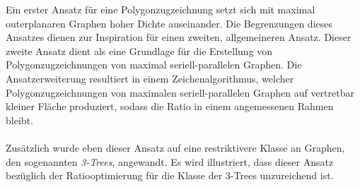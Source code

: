 Ein erster Ansatz für eine Polygonzugzeichnung setzt sich mit maximal outerplanaren Graphen hoher Dichte auseinander. Die Begrenzungen dieses Ansatzes dienen zur Inspiration für einen zweiten, allgemeineren Ansatz. Dieser zweite Ansatz dient als eine Grundlage für die Erstellung von Polygonzugzeichnungen von maximal seriell-parallelen Graphen. Die Ansatzerweiterung resultiert in einem Zeichenalgorithmus, welcher Polygonzugzeichnungen von maximalen seriell-parallelen Graphen auf vertretbar kleiner Fläche produziert, sodass die Ratio in einem angemessenen Rahmen bleibt.\\\\
Zusätzlich wurde eben dieser Ansatz auf eine restriktivere Klasse an Graphen, den sogenannten \emph{3-Trees}, angewandt. Es wird illustriert, dass dieser Ansatz bezüglich der Ratiooptimierung für die Klasse der 3-Trees unzureichend ist.